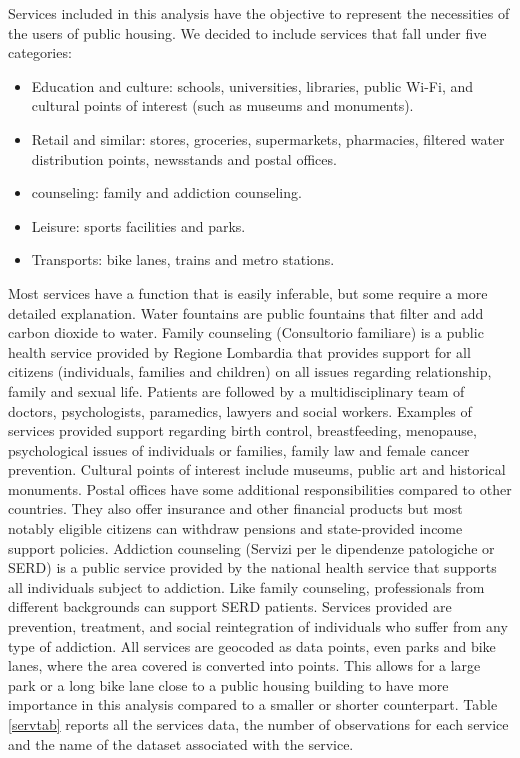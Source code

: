 \documentclass[12pt]{article}
\begin{document}
Services included in this analysis have the objective to represent the necessities of the users of public housing. We decided to include services that fall under five categories:
\begin{itemize}
	\item Education and culture: schools, universities, libraries, public Wi-Fi, and cultural points of interest (such as museums and monuments).
	\item  Retail and similar: stores, groceries, supermarkets, pharmacies, filtered water distribution points, newsstands and postal offices. 
	\item counseling: family and addiction counseling.
	\item Leisure: sports facilities and parks.
	\item Transports: bike lanes, trains and metro stations.
\end{itemize}
Most services have a function that is easily inferable, but some require a more detailed explanation. Water fountains are public fountains that filter and add carbon dioxide to water. Family counseling (Consultorio familiare) is a public health service provided by Regione Lombardia that provides support for all citizens (individuals, families and children) on all issues regarding relationship, family and sexual life. Patients are followed by a multidisciplinary team of doctors, psychologists, paramedics, lawyers and social workers. Examples of services provided support regarding birth control, breastfeeding, menopause, psychological issues of individuals or families, family law and female cancer prevention. Cultural points of interest include museums, public art and historical monuments. Postal offices have some additional responsibilities compared to other countries. They also offer insurance and other financial products but most notably eligible citizens can withdraw pensions and state-provided income support policies. Addiction counseling (Servizi per le dipendenze patologiche or SERD) is a public service provided by the national health service that supports all individuals subject to addiction. Like family counseling, professionals from different backgrounds can support SERD patients.  Services provided are prevention, treatment, and social reintegration of individuals who suffer from any type of addiction. All services are geocoded as data points, even parks and bike lanes, where the area covered is converted into points. This allows for a large park or a long bike lane close to a public housing building to have more importance in this analysis compared to a smaller or shorter counterpart. Table \ref{servtab} reports all the services data, the number of observations for each service and the name of the dataset associated with the service.
\end{document}
